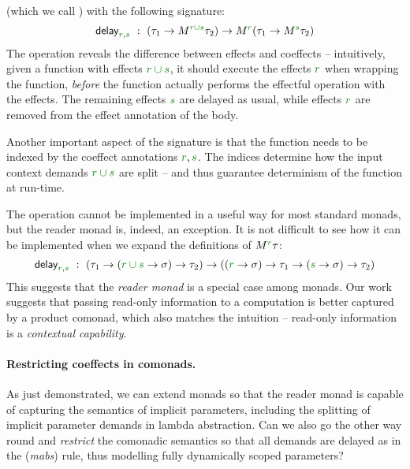 (which we call ) with the following signature:
%
\begin{equation*}
\ident{delay}_{\cclrd{r}, \cclrd{s}}~:~(\tau_1\rightarrow\mtyp{\cclrd{r \cup s}}{\tau_2}) \rightarrow \mtyp{\cclrd{r}}(\tau_1\rightarrow\mtyp{\cclrd{s}}{\tau_2})
\end{equation*}
%
The operation reveals the difference between effects and coeffects -- intuitively, given a function
with effects $\cclrd{r \cup s}$, it should execute the effects $\cclrd{r}$ when wrapping the
function, \emph{before} the function actually performs the effectful operation with the effects.
The remaining effects $\cclrd{s}$ are delayed as usual, while effects $\cclrd{r}$ are removed
from the effect annotation of the body.

Another important aspect of the signature is that the function needs to be indexed by the coeffect
annotations $\cclrd{r}, \cclrd{s}$. The indices determine how the input context demands
$\cclrd{r \cup s}$ are split -- and thus guarantee determinism of the function at run-time.

The operation cannot be implemented in a useful way for most standard monads, but the
reader monad is, indeed, an exception. It is not difficult to see how it can be implemented
when we expand the definitions of $\mtyp{\cclrd{r}}\tau$:
%
\begin{equation*}
\ident{delay}_{\cclrd{r}, \cclrd{s}}~:~
(\tau_1\rightarrow(\cclrd{r \cup s} \rightarrow \sigma) \rightarrow \tau_2) \rightarrow
((\cclrd{r} \rightarrow \sigma) \rightarrow \tau_1\rightarrow(\cclrd{s} \rightarrow \sigma) \rightarrow \tau_2)
\end{equation*}
%
This suggests that the \emph{reader monad} is a special case among monads. Our work suggests that
passing read-only information to a computation is better captured by a product comonad, which also
matches the intuition -- read-only information is a \emph{contextual capability}.

\paragraph{Restricting coeffects in comonads.}
As just demonstrated, we can extend monads so that the reader monad is capable of capturing
the semantics of implicit parameters, including the splitting of implicit parameter demands
in lambda abstraction. Can we also go the other way round and \emph{restrict} the comonadic
semantics so that all demands are delayed as in the (\emph{mabs}) rule, thus modelling
fully dynamically scoped parameters?


